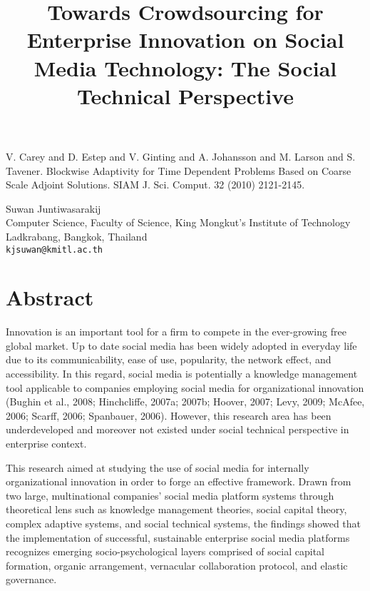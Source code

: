 \documentclass[article,A4,11pt]{llncs}%
\begin{document}

\begin{thebibliography}{10}
{\sc V. Carey and D. Estep and V. Ginting and A. Johansson and M. Larson and S. Tavener}. {Blockwise Adaptivity for Time Dependent Problems Based on Coarse Scale Adjoint Solutions}. SIAM J. Sci. Comput. 32 (2010) 2121-2145.
\end{thebibliography}

\title{Towards Crowdsourcing for Enterprise Innovation on Social Media Technology: The Social Technical Perspective}
 \author{} \institute{}
\maketitle
\begin{center}
{\large Suwan Juntiwasarakij}\\
Computer Science, Faculty of Science, King Mongkut's Institute of Technology Ladkrabang, Bangkok, Thailand\\
{\tt kjsuwan@kmitl.ac.th}
\end{center}

\section*{Abstract}
Innovation is an important tool for a firm to compete in the ever-growing free global market. Up to date social media has been widely adopted in everyday life due to its communicability, ease of use, popularity, the network effect, and accessibility. In this regard, social media is potentially a knowledge management tool applicable to companies employing social media for organizational innovation (Bughin et al., 2008; Hinchcliffe, 2007a; 2007b; Hoover, 2007; Levy, 2009; McAfee, 2006; Scarff, 2006; Spanbauer, 2006). However, this research area has been underdeveloped and moreover not existed under social technical perspective in enterprise context.

This research aimed at studying the use of social media for internally organizational innovation in order to forge an effective framework. Drawn from two large, multinational companies’ social media platform systems through theoretical lens such as knowledge management theories, social capital theory, complex adaptive systems, and social technical systems, the findings showed that the implementation of successful, sustainable enterprise social media platforms recognizes emerging socio-psychological layers comprised of social capital formation, organic arrangement, vernacular collaboration protocol, and elastic governance. 
\end{document}
